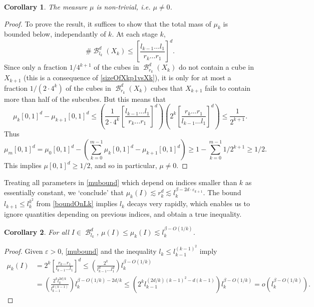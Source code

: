 \documentclass[dvipsnames,letterpaper,12pt]{article}
\numberwithin{equation}{section}
\theoremstyle{plain}
\newtheorem{corollary}{Corollary}
\DeclareMathOperator{\B}{\mathcal{B}}
\begin{document}
\begin{corollary}
	The measure $\mu$ is non-trivial, i.e. $\mu \neq 0$.
\end{corollary}
\begin{proof}
	To prove the result, it suffices to show that the total mass of $\mu_k$ is bounded below, independantly of $k$. At each stage $k$,
	\[ \# \B^d_{l_k}(X_k) \leq \left[ \frac{l_{k-1} \dots l_1}{r_k \dots r_1} \right]^d. \]
	Since only a fraction $1/4^{k+1}$ of the cubes in $\B^d_{r_k}(X_k)$ do not contain a cube in $X_{k+1}$ (this is a consequence of \eqref{sizeOfXkp1vsXk}), it is only for at most a fraction $1/(2 \cdot 4^k)$ of the cubes in $\B^d_{r_k}(X_k)$ cubes that $X_{k+1}$ fails to contain more than half of the subcubes. But this means that
	\[ \mu_k[0,1]^d - \mu_{k+1}[0,1]^d \leq \left( \frac{1}{2 \cdot 4^k} \left[ \frac{l_{k-1} \dots l_1}{r_k \dots r_1} \right]^d \right) \left( 2^k \left[ \frac{r_k \dots r_1}{l_{k-1} \dots l_1} \right]^d \right) \leq \frac{1}{2^{k+1}}. \]
	Thus
	\[ \mu_m[0,1]^d = \mu_0[0,1]^d - \left( \sum_{k = 0}^{m-1} \mu_k[0,1]^d - \mu_{k+1}[0,1]^d \right) \geq 1 - \sum_{k = 0}^{m-1} 1/2^{k+1} \geq 1/2. \]
	This implies $\mu[0,1]^d \geq 1/2$, and so in particular, $\mu \neq 0$.
\end{proof}

Treating all parameters in \eqref{mubound} which depend on indices smaller than $k$ as essentially constant, we `conclude' that $\mu_k(I) \lesssim r_k^d \lesssim l_k^{\beta - 2d \cdot \varepsilon_{k+1}}$. The bound $l_{k+1} \leq l_k^{k^2}$ from \eqref{boundOnLk} implies $l_k$ decays very rapidly, which enables us to ignore quantities depending on previous indices, and obtain a true inequality.

\begin{corollary}
	For all $I \in \B^d_{l_k}$, $\mu(I) \leq \mu_k(I) \lesssim l_k^{\beta - O(1/k)}$.
\end{corollary}
\begin{proof}
	Given $\varepsilon > 0$, \eqref{mubound} and the inequality $l_k \leq l_{k-1}^{(k-1)^2}$ imply
	\begin{align*}
		\mu_k(I) &= 2^k \left[ \frac{r_k \dots r_1}{l_{k-1} \dots l_1} \right]^d \leq \left( \frac{2^k}{l_{k-1}^d \dots l_1^d} \right) l_k^{\beta - O(1/k)}\\
		&= \left( \frac{2^k l_k^{2d/k}}{l_{k-1}^{d(k-1)}} \right) l_k^{\beta - O(1/k) - 2d/k} \leq \left( 2^k l_{k-1}^{(2d/k)(k-1)^2 - d(k-1)} \right) l_k^{\beta - O(1/k)} = o(l_k^{\beta - O(1/k)}). \tag*{\qedhere}
	\end{align*}
\end{proof}
\end{document}
